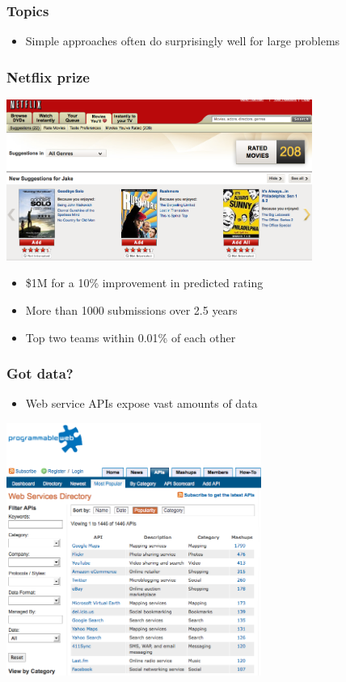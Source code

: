 \documentclass[xcolor=dvipsnames, 9pt]{beamer}
\begin{document}
\begin{frame}
  \frametitle{Topics}

  \begin{itemize}
    \item Simple approaches often do surprisingly well for large problems
  \end{itemize}

\end{frame}

\begin{frame}
  \frametitle{Netflix prize}

    \begin{center}
      \includegraphics[width=0.75\textwidth]{netflix.png}
    \end{center}

    \begin{itemize}
      \item \$1M for a 10\% improvement in predicted rating
      \item More than 1000 submissions over 2.5 years
      \item Top two teams within 0.01\% of each other 
    \end{itemize}

\end{frame}


\begin{frame}
  \frametitle{Got data?}

  \begin{itemize}
    \item Web service APIs expose vast amounts of data
  \end{itemize}

    \begin{center}
      \includegraphics[width=0.625\textwidth]{programmableweb.png}
    \end{center}

\end{frame}
\end{document}
